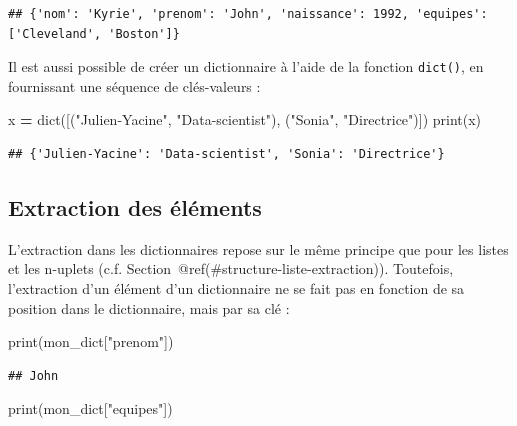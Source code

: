 \documentclass[12pt,]{book}
\newenvironment{Shaded}{\begin{snugshade}}{\end{snugshade}}
\newcommand{\StringTok}[1]{\textcolor[rgb]{0.31,0.60,0.02}{#1}}
\newcommand{\OperatorTok}[1]{\textcolor[rgb]{0.81,0.36,0.00}{\textbf{#1}}}
\newcommand{\BuiltInTok}[1]{#1}
\newcommand{\NormalTok}[1]{#1}
\numberwithin{equation}{section}
\numberwithin{countremarque}{section}
\begin{document}
\begin{lstlisting}
## {'nom': 'Kyrie', 'prenom': 'John', 'naissance': 1992, 'equipes': ['Cleveland', 'Boston']}
\end{lstlisting}

Il est aussi possible de créer un dictionnaire à l'aide de la fonction
\texttt{dict()}, en fournissant une séquence de clés-valeurs :

\begin{Shaded}
\begin{Highlighting}[]
\NormalTok{x }\OperatorTok{=} \BuiltInTok{dict}\NormalTok{([(}\StringTok{"Julien-Yacine"}\NormalTok{, }\StringTok{"Data-scientist"}\NormalTok{),}
\NormalTok{  (}\StringTok{"Sonia"}\NormalTok{, }\StringTok{"Directrice"}\NormalTok{)])}
\BuiltInTok{print}\NormalTok{(x)}
\end{Highlighting}
\end{Shaded}

\begin{lstlisting}
## {'Julien-Yacine': 'Data-scientist', 'Sonia': 'Directrice'}
\end{lstlisting}

\subsection{Extraction des éléments}\label{extraction-des-elements-1}

L'extraction dans les dictionnaires repose sur le même principe que pour
les listes et les n-uplets (c.f.
Section~@ref(\#structure-liste-extraction)). Toutefois, l'extraction
d'un élément d'un dictionnaire ne se fait pas en fonction de sa position
dans le dictionnaire, mais par sa clé :

\begin{Shaded}
\begin{Highlighting}[]
\BuiltInTok{print}\NormalTok{(mon_dict[}\StringTok{"prenom"}\NormalTok{])}
\end{Highlighting}
\end{Shaded}

\begin{lstlisting}
## John
\end{lstlisting}

\begin{Shaded}
\begin{Highlighting}[]
\BuiltInTok{print}\NormalTok{(mon_dict[}\StringTok{"equipes"}\NormalTok{])}
\end{Highlighting}
\end{Shaded}
\end{document}
